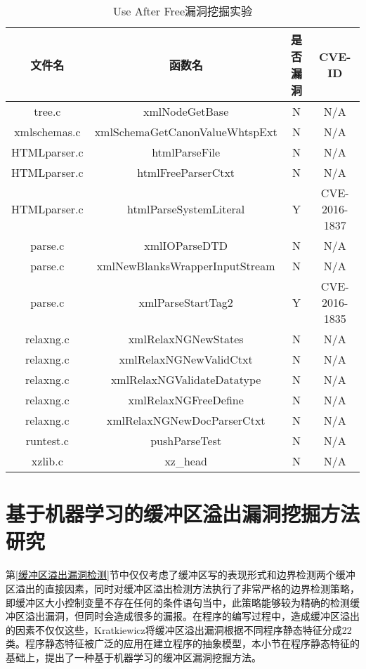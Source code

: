 {\begin{table}[ht]
\begin{center}
\caption{Use After Free漏洞挖掘实验} \label{use after free漏洞挖掘实验}
\begin{small}
\begin{tabular}{cccc}
\hline 
文件名 & 函数名 & 是否漏洞 & CVE-ID\tabularnewline
\hline 
tree.c & xmlNodeGetBase & N & N/A\tabularnewline
xmlschemas.c & xmlSchemaGetCanonValueWhtspExt & N & N/A\tabularnewline
HTMLparser.c & htmlParseFile & N & N/A\tabularnewline
HTMLparser.c & htmlFreeParserCtxt & N & N/A\tabularnewline
HTMLparser.c & htmlParseSystemLiteral & Y & CVE-2016-1837\tabularnewline
parse.c & xmlIOParseDTD & N & N/A\tabularnewline
parse.c & xmlNewBlanksWrapperInputStream & N & N/A\tabularnewline
parse.c & xmlParseStartTag2 & Y & CVE-2016-1835\tabularnewline
relaxng.c & xmlRelaxNGNewStates & N & N/A\tabularnewline
relaxng.c & xmlRelaxNGNewValidCtxt & N & N/A\tabularnewline
relaxng.c & xmlRelaxNGValidateDatatype & N & N/A\tabularnewline
relaxng.c & xmlRelaxNGFreeDefine & N & N/A\tabularnewline
relaxng.c & xmlRelaxNGNewDocParserCtxt & N & N/A\tabularnewline
runtest.c & pushParseTest & N & N/A\tabularnewline
xzlib.c & xz\_head & N & N/A\tabularnewline
\hline 
\end{tabular}
\end{small}
\end{center}
\end{table}


\section{基于机器学习的缓冲区溢出漏洞挖掘方法研究}
\label{基于机器学习的缓冲区溢出漏洞挖掘方法研究}

第\ref{缓冲区溢出漏洞检测}节中仅仅考虑了缓冲区写的表现形式和边界检测两个缓冲区溢出的直接因素，同时对缓冲区溢出检测方法执行了非常严格的边界检测策略，即缓冲区大小控制变量不存在任何的条件语句当中，此策略能够较为精确的检测缓冲区溢出漏洞，但同时会造成很多的漏报。在程序的编写过程中，造成缓冲区溢出的因素不仅仅这些，Kratkiewicz将缓冲区溢出漏洞根据不同程序静态特征分成22类。程序静态特征被广泛的应用在建立程序的抽象模型，本小节在程序静态特征的基础上，提出了一种基于机器学习的缓冲区漏洞挖掘方法。

}
